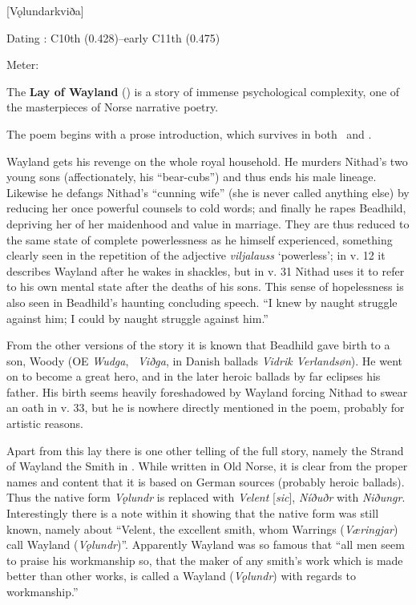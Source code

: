[Vǫlundarkviða]

\begin{flushright}%
Dating \parencite{Sapp2022}: C10th (0.428)–early C11th (0.475)

Meter: \Fornyrdislag%
\end{flushright}%


The \textbf{Lay of Wayland} (\Volundarkvida) is a story of immense psychological complexity, one of the masterpieces of Norse narrative poetry.

The poem begins with a prose introduction, which survives in both \Regius\ and \AM.

Wayland gets his revenge on the whole royal household. He murders Nithad’s two young sons (affectionately, his “bear-cubs”) and thus ends his male lineage. Likewise he defangs Nithad’s “cunning wife” (she is never called anything else) by reducing her once powerful counsels to cold words; and finally he rapes Beadhild, depriving her of her maidenhood and value in marriage. They are thus reduced to the same state of complete powerlessness as he himself experienced, something clearly seen in the repetition of the adjective \emph{viljalauss} ‘powerless’; in v. 12 it describes Wayland after he wakes in shackles, but in v. 31 Nithad uses it to refer to his own mental state after the deaths of his sons. This sense of hopelessness is also seen in Beadhild’s haunting concluding speech. “I knew by naught struggle against him; I could by naught struggle against him.”

From the other versions of the story it is known that Beadhild gave birth to a son, Woody (OE \emph{Wudga}, \ThidreksSaga\ \emph{Viðga}, in Danish ballads \emph{Vidrik Verlandsøn}). He went on to become a great hero, and in the later heroic ballads by far eclipses his father. His birth seems heavily foreshadowed by Wayland forcing Nithad to swear an oath in v. 33, but he is nowhere directly mentioned in the poem, probably for artistic reasons.

Apart from this lay there is one other telling of the full story, namely the Strand of Wayland the Smith in \ThidreksSaga. While written in Old Norse, it is clear from the proper names and content that it is based on German sources (probably heroic ballads). Thus the native form \emph{Vǫlundr} is replaced with \emph{Velent} [\emph{sic}], \emph{Níðuðr} with \emph{Niðungr}. Interestingly there is a note within it showing that the native form was still known, namely about “Velent, the excellent smith, whom Warrings (\emph{Væringjar}) call Wayland (\emph{Vǫlundr})”. Apparently Wayland was so famous that “all men seem to praise his workmanship so, that the maker of any smith’s work which is made better than other works, is called a Wayland (\emph{Vǫlundr}) with regards to workmanship.”

